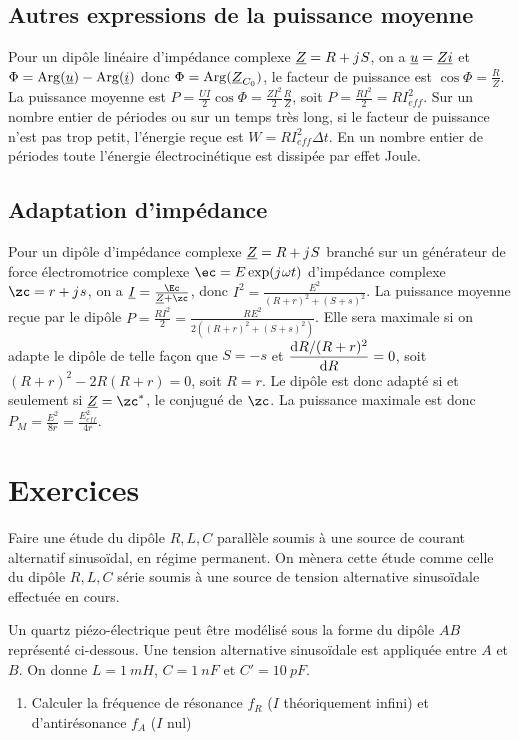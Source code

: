 	\subsection{Autres expressions de la puissance moyenne}
		Pour un dipôle linéaire d'impédance complexe $\underline{Z} = R +{j\mkern1mu} S$, on a $\underline{u} = \underline{Z} \underline{i}$ et $\Phi = \operatorname{Arg}(\underline{u}) - \operatorname{Arg}(\underline{i})$ donc $\Phi = \operatorname{Arg}(\underline{Z}_{C_0})$, le facteur de puissance est $\cos\Phi = \frac{R}{Z}$. La puissance moyenne est $P = \frac{UI}{2}\cos\Phi = \frac{ZI^2}{2} \frac{R}{Z}$, soit $P=\frac{RI^2}{2}=RI_{eff}^2$. Sur un nombre entier de périodes ou sur un temps très long, si le facteur de puissance n'est pas trop petit, l'énergie reçue est $W=RI_{eff}^2 \Delta t$. En un nombre entier de périodes toute l'énergie électrocinétique est dissipée par effet Joule.
	\subsection{Adaptation d'impédance}
		Pour un dipôle d'impédance complexe $\underline{Z} = R + {j\mkern1mu} S$ branché sur un générateur de force électromotrice complexe $\ec = E\exp(\ju \omega t)$ d'impédance complexe $\zc = r + \ju s$, on a $\Ic = \frac{\Ec}{\Zc + \zc}$, donc $I^2 = \frac{E^2}{(R+r)^2+(S+s)^2}$. La puissance moyenne reçue par le dipôle $P = \frac{RI^2}{2} = \frac{RE^2}{2((R+r)^2+(S+s)^2)}$. Elle sera maximale si on adapte le dipôle de telle façon que $S=-s$ et $\dfrac{\mathrm{d} R/(R+r)^2}{\mathrm{d} R}=0$, soit $(R+r)^2-2R(R+r)=0$, soit $R=r$. Le dipôle est donc adapté si et seulement si $\Zc = \zc^*$, le conjugué de $\zc$. La puissance maximale est donc $P_M = \frac{E^2}{8r} = \frac{E_{eff}^2}{4r}$.
\section{Exercices}
	\begin{exercice}
		Faire une étude du dipôle $R, L, C$ parallèle soumis à une source de courant alternatif sinusoïdal, en régime permanent. On mènera cette étude comme celle du dipôle $R, L, C$ série soumis à une source de tension alternative sinusoïdale effectuée en cours.
	\end{exercice}
	\begin{exercice}
		Un quartz piézo-électrique peut être modélisé sous la forme du dipôle $AB$ représenté ci-dessous. Une tension alternative sinusoïdale est appliquée entre $A$ et $B$. On donne $L=\SI{1}{mH}$, $C=\SI{1}{nF}$ et $C'=\SI{10}{pF}$.
		\begin{enumerate}
			\item Calculer la fréquence de résonance $f_R$ ($I$ théoriquement infini) et d'antirésonance $f_A$ ($I$ nul)
		\end{enumerate}
	\end{exercice}
